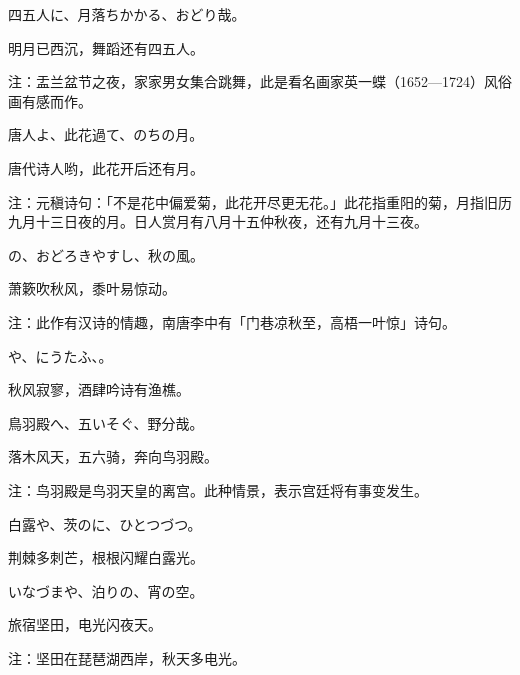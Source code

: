 \begin{haiku}
    {\FH 四五人に、月落ちかかる、おどり哉。}

    {\FK 明月已西沉，舞蹈还有四五人。}

    {\FT 注：盂兰盆节之夜，家家男女集合跳舞，此是看名画家英一蝶（1652—1724）风俗画有感而作。}
\end{haiku}

\begin{haiku}
    {\FH 唐人よ、此花過て、のちの月。}

    {\FK 唐代诗人哟，此花开后还有月。}

    {\FT 注：元稹诗句：「不是花中偏爱菊，此花开尽更无花。」此花指重阳的菊，月指旧历九月十三日夜的月。日人赏月有八月十五仲秋夜，还有九月十三夜。}
\end{haiku}

\begin{haiku}
    {\FH {}の、おどろきやすし、秋の風。}

    {\FK 萧簌吹秋风，黍叶易惊动。}

    {\FT 注：此作有汉诗的情趣，南唐李中有「门巷凉秋至，高梧一叶惊」诗句。}
\end{haiku}

\begin{haiku}
    {\FH {}や、にうたふ、。}

    {\FK 秋风寂寥，酒肆吟诗有渔樵。}
\end{haiku}

\begin{haiku}
    {\FH 鳥羽殿へ、五いそぐ、野分哉。}

    {\FK 落木风天，五六骑，奔向鸟羽殿。}

    {\FT 注：鸟羽殿是鸟羽天皇的离宫。此种情景，表示宫廷将有事变发生。}
\end{haiku}

\begin{haiku}
    {\FH 白露や、茨のに、ひとつづつ。}

    {\FK 荆棘多刺芒，根根闪耀白露光。}
\end{haiku}

\begin{haiku}
    {\FH いなづまや、泊りの、宵の空。}

    {\FK 旅宿坚田，电光闪夜天。}

    {\FT 注：坚田在琵琶湖西岸，秋天多电光。}
\end{haiku}

